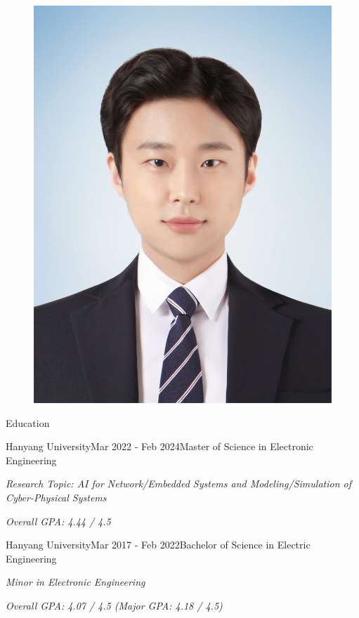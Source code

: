 \documentclass[
	11pt, %
]{resume} %
\begin{document}
\begin{figure}[h!]
    \centerline{\includegraphics[width=0.33\columnwidth]{../../img/2.jpg}}
  \end{figure}


\begin{rSection}{Education}
	\begin{rSubsection}{Hanyang University}{Mar 2022 - Feb 2024}{Master of Science in Electronic Engineering}{}
		\item \textit{Research Topic: AI for Network/Embedded Systems and Modeling/Simulation of Cyber-Physical Systems}
		\item \textit{Overall GPA: 4.44 / 4.5}
	\end{rSubsection}

	\begin{rSubsection}{Hanyang University}{Mar 2017 - Feb 2022}{Bachelor of Science in Electric Engineering}{}
		\item \textit{Minor in Electronic Engineering}
		\item \textit{Overall GPA: 4.07 / 4.5 (Major GPA: 4.18 / 4.5)}
	\end{rSubsection}

\end{rSection}

\end{document}
